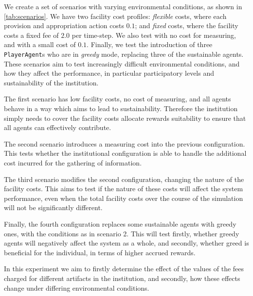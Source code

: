 We create a set of scenarios with varying environmental conditions, as shown
in \autoref{tab:scenarios}. We have two facility cost profiles:
\emph{flexible} costs, where each provision and appropriation action costs
$0.1$; and \emph{fixed} costs, where the facility costs a fixed fee of $2.0$ per
time-step. We also test with no cost for measuring, and with a small cost of
$0.1$. Finally, we test the introduction of three \texttt{PlayerAgent}s who are in
\emph{greedy} mode, replacing three of the sustainable agents. These scenarios aim to test increasingly difficult environmental conditions, and how they affect the performance, in particular participatory levels and sustainability of the institution.

The first scenario has low facility costs, no cost of
measuring, and all agents behave in a way which aims to lead to
sustainability. Therefore the institution simply needs to cover the facility
costs allocate rewards suitability to ensure that all agents can effectively
contribute.

The second scenario introduces a measuring cost into the previous
configuration. This tests whether the institutional configuration is able to
handle the additional cost incurred for the gathering of information.

The third scenario modifies the second configuration, changing the nature of
the facility costs. This aims to test if the nature of these costs will affect
the system performance, even when the total facility costs over the course of
the simulation will not be significantly different.

Finally, the fourth configuration replaces some sustainable agents with greedy ones, with the conditions
as in scenario 2. This will test firstly, whether greedy agents will negatively
affect the system as a whole, and secondly, whether greed is beneficial for
the individual, in terms of higher accrued rewards.

In this experiment we aim to firstly determine the effect of the values of
the fees charged for different artifacts in the institution, and secondly, how
these effects change under differing environmental conditions.



